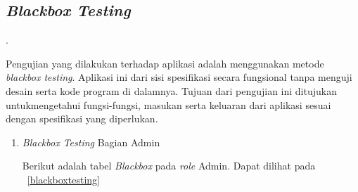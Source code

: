 \subsection {\textit{Blackbox Testing}}.


Pengujian yang dilakukan terhadap aplikasi adalah menggunakan metode \textit{blackbox testing}. Aplikasi ini dari sisi spesifikasi secara fungsional tanpa menguji desain serta kode program di dalamnya. Tujuan dari pengujian ini ditujukan untukmengetahui fungsi-fungsi, masukan serta keluaran dari aplikasi sesuai dengan spesifikasi yang diperlukan.
\begin{enumerate}
	\item \textit{Blackbox Testing} Bagian Admin
	
	Berikut adalah tabel \textit{Blackbox} pada \textit{role} Admin. Dapat dilihat pada \tab~\ref{blackboxtesting}
	 {\fontsize{10pt}{12pt}\selectfont
	\renewcommand\namaTabel{Hasil pengujian \textit{blackbox testing} Admin}
		
}
\end{enumerate}
